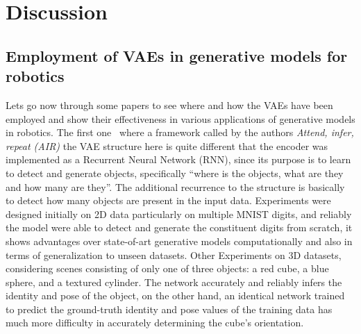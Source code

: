

\pagestyle{fancy} 
\chapter{Discussion}
\label{cha:3}
\vspace{1cm}

\section{Employment of VAEs in generative models for robotics}
\label{sec:VAE_generative}
Lets go now through some papers to see where and how the VAEs have been employed and show their effectiveness in various applications of generative models in robotics. The first one~\cite{eslami2016attend} where a framework called by the authors \textsl{Attend, infer, repeat (AIR)} the VAE structure here is quite different that the encoder was implemented as a Recurrent Neural Network (RNN), since its purpose is to learn to detect and generate objects, specifically “where is the objects, what are they and how many are they”. The additional recurrence to the structure is basically to detect how many objects are present in the input data. Experiments were designed initially on 2D data particularly on multiple MNIST digits, and reliably the model were able to detect and generate the constituent digits from scratch, it shows advantages over state-of-art generative models computationally and also in terms of generalization to unseen datasets. Other Experiments on 3D datasets, considering scenes consisting of only one of three objects: a red cube, a blue sphere, and a textured cylinder. The network accurately and reliably infers the identity and pose of the object, on the other hand, an identical network trained to predict the ground-truth identity and pose values of the training data has much more difficulty in accurately determining the cube’s orientation.\\

